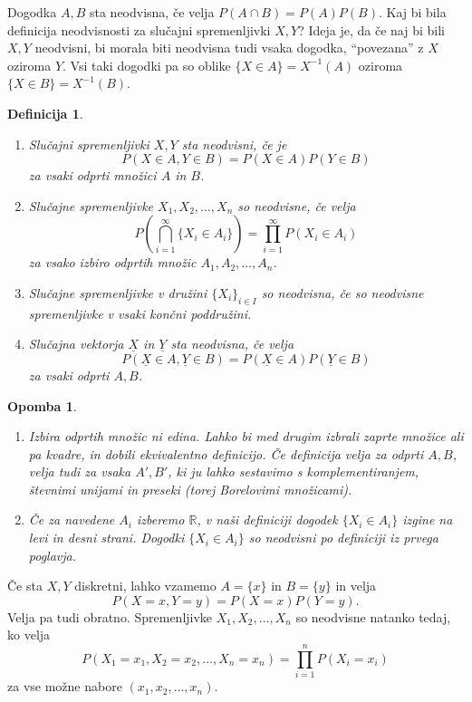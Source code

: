 \documentclass[10pt, a4paper]{article}
\newtheorem{defi}[izr]{Definicija}
\newenvironment{noticeB}{%
  \tcolorbox[%
  notitle,
  empty,
  enhanced,  %
  breakable,
  coltext=black,
  colback=white, 
  fontupper=\rmfamily,
  noparskip,
  sharp corners,
  boxrule=-1pt,  %
  frame hidden,
  left=7pt,  %
  right=7pt,
  top=5pt,
  bottom=5pt,
  before skip=2.5ex plus 2pt,
  after skip=2.5ex plus 2pt,
  borderline west = {1.5pt}{-0.1pt}{blue!30!black}, %
  overlay unbroken and last={%
    \draw[color=black, line width=1.25pt]
    ($(frame.south west)+(1.pt, -0.1pt)$) -- ++(2em, 0);
  }
  ]}
{\endtcolorbox}
\newenvironment{definicija}{\begin{noticeB}\begin{defi}}{%
    \end{defi}\end{noticeB}}
\newtheorem*{opomba}{Opomba}
\newcommand{\R}{\mathbb {R}}
\begin{document}
Dogodka $A, B$ sta neodvisna, če velja $P(A \cap B) = P(A) P(B)$.
Kaj bi bila definicija neodvisnosti za slučajni spremenljivki $X, Y$?
Ideja je, da če naj bi bili $X, Y$ neodvisni, bi morala biti neodvisna 
tudi vsaka dogodka, "`povezana"' z $X$ oziroma $Y$.
Vsi taki dogodki pa so oblike $\{X \in A\} = X^{-1} (A)$ oziroma
$\{X \in B\} = X^{-1} (B)$.

\begin{definicija}
  \begin{enumerate}
    \item Slučajni spremenljivki $X, Y$ sta neodvisni,
    če je $$P(X \in A, Y \in B) = P(X \in A) P(Y \in B)$$
    za vsaki odprti množici $A$ in $B$.
    \item Slučajne spremenljivke $X_1, X_2, \dots, X_n$ so neodvisne, 
    če velja $$P\left( \bigcap_{i = 1}^\infty \{X_i \in A_i\}\right) = \prod_{i = 1}^\infty P(X_i \in A_i)$$
    za vsako izbiro odprtih množic $A_1, A_2, \dots, A_n$.
    \item Slučajne spremenljivke v družini $\{X_i\}_{i \in I}$ so neodvisna, če so neodvisne spremenljivke v vsaki končni poddružini.
    \item Slučajna vektorja $\underline{X}$ in $\underline{Y}$ sta neodvisna, če velja 
    $$P(\underline{X} \in A, \underline{Y} \in B) = P(\underline{X} \in A) P(\underline{Y} \in B)$$ za vsaki odprti $A, B$.
  \end{enumerate}
\end{definicija}

\begin{opomba}
  \begin{enumerate}
    \item Izbira odprtih množic ni edina. Lahko bi med drugim izbrali zaprte množice ali pa kvadre, 
    in dobili ekvivalentno definicijo. Če definicija velja za odprti $A, B$,
    velja tudi za vsaka $A', B'$, ki ju lahko sestavimo s komplementiranjem, števnimi unijami in preseki (torej Borelovimi množicami).
    \item Če za navedene $A_i$ izberemo $\R$, v naši definiciji dogodek $\{X_i \in A_i\}$ izgine na levi in desni strani.
    Dogodki $\{X_i \in A_i\}$ so neodvisni po definiciji iz prvega poglavja.
  \end{enumerate}
\end{opomba}    

Če sta $X, Y$ diskretni, lahko vzamemo $A = \{x\}$ in $B = \{y\}$ in
velja $$P(X = x, Y = y) = P(X = x) P(Y = y).$$
Velja pa tudi obratno. Spremenljivke $X_1, X_2, \dots, X_n$ so neodvisne natanko tedaj,
ko velja $$P(X_1 = x_1, X_2 = x_2, \dots, X_n = x_n) = \prod_{i = 1} ^n P(X_i = x_i)$$
za vse možne nabore $(x_1, x_2, \dots, x_n)$.
\end{document}

